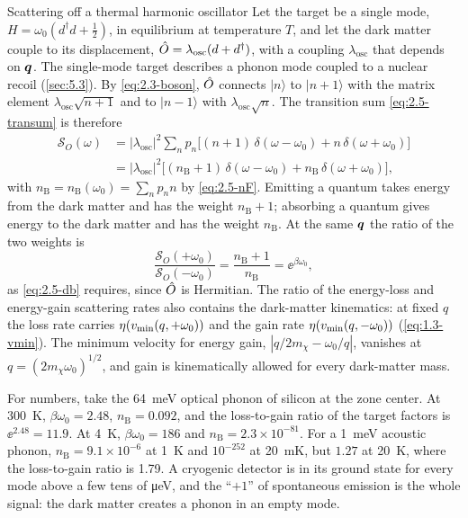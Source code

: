 \begin{workedexample}{Scattering off a thermal harmonic oscillator}\label{we:2-oscillator}
Let the target be a single mode, $H = \omega_0(d^\dagger d + \tfrac12)$, in equilibrium at temperature $T$, and let the dark matter couple to its displacement, $\hat{O} = \lambda_{\mathrm{osc}}(d + d^\dagger)$, with a coupling $\lambda_{\mathrm{osc}}$ that depends on $\bm{q}$. The single-mode target describes a phonon mode coupled to a nuclear recoil (\cref{sec:5.3}). By \cref{eq:2.3-boson}, $\hat{O}$ connects $|n\rangle$ to $|n + 1\rangle$ with the matrix element $\lambda_{\mathrm{osc}}\sqrt{n + 1}$ and to $|n - 1\rangle$ with $\lambda_{\mathrm{osc}}\sqrt{n}$. The transition sum \cref{eq:2.5-transum} is therefore
\begin{equation*}
  \begin{split}
  \mathcal{S}_O(\omega) &= |\lambda_{\mathrm{osc}}|^2\sum_np_n\bigl[(n + 1)\,\delta(\omega - \omega_0) + n\,\delta(\omega + \omega_0)\bigr]\\
  &= |\lambda_{\mathrm{osc}}|^2\bigl[(n_{\mathrm{B}} + 1)\,\delta(\omega - \omega_0) + n_{\mathrm{B}}\,\delta(\omega + \omega_0)\bigr],
  \end{split}
\end{equation*}
with $n_{\mathrm{B}} = n_{\mathrm{B}}(\omega_0) = \sum_np_nn$ by \cref{eq:2.5-nF}. Emitting a quantum takes energy from the dark matter and has the weight $n_{\mathrm{B}} + 1$; absorbing a quantum gives energy to the dark matter and has the weight $n_{\mathrm{B}}$. At the same $\bm{q}$ the ratio of the two weights is
\begin{equation*}
  \frac{\mathcal{S}_O(+\omega_0)}{\mathcal{S}_O(-\omega_0)} = \frac{n_{\mathrm{B}} + 1}{n_{\mathrm{B}}} = \ee^{\beta\omega_0},
\end{equation*}
as \cref{eq:2.5-db} requires, since $\hat{O}$ is Hermitian. The ratio of the energy-loss and energy-gain scattering rates also contains the dark-matter kinematics: at fixed $q$ the loss rate carries $\eta(v_{\mathrm{min}}(q, +\omega_0))$ and the gain rate $\eta(v_{\mathrm{min}}(q, -\omega_0))$ (\cref{eq:1.3-vmin}). The minimum velocity for energy gain, $|q/2m_\chi - \omega_0/q|$, vanishes at $q = (2m_\chi\omega_0)^{1/2}$, and gain is kinematically allowed for every dark-matter mass.

For numbers, take the \SI{64}{meV} optical phonon of silicon at the zone center. At \SI{300}{K}, $\beta\omega_0 = 2.48$, $n_{\mathrm{B}} = 0.092$, and the loss-to-gain ratio of the target factors is $\ee^{2.48} = 11.9$. At \SI{4}{K}, $\beta\omega_0 = 186$ and $n_{\mathrm{B}} = 2.3\times10^{-81}$. For a \SI{1}{meV} acoustic phonon, $n_{\mathrm{B}} = 9.1\times10^{-6}$ at \SI{1}{K} and $10^{-252}$ at \SI{20}{mK}, but $1.27$ at \SI{20}{K}, where the loss-to-gain ratio is 1.79. A cryogenic detector is in its ground state for every mode above a few tens of \si{\micro eV}, and the ``$+1$'' of spontaneous emission is the whole signal: the dark matter creates a phonon in an empty mode.


\end{workedexample}
